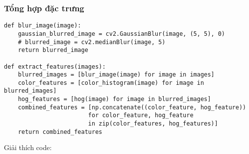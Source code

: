 \documentclass[a4paper,12pt]{article}
\begin{document}
\subsubsection{Tổng hợp đặc trưng}
\label{subsubsec:tong-hop-dac-trung}

\begin{verbatim}
def blur_image(image):
    gaussian_blurred_image = cv2.GaussianBlur(image, (5, 5), 0)
    # blurred_image = cv2.medianBlur(image, 5)
    return blurred_image

def extract_features(images):
    blurred_images = [blur_image(image) for image in images]
    color_features = [color_histogram(image) for image in blurred_images]
    hog_features = [hog(image) for image in blurred_images]
    combined_features = [np.concatenate((color_feature, hog_feature)) 
                        for color_feature, hog_feature 
                        in zip(color_features, hog_features)]
    return combined_features
\end{verbatim}

\noindent Giải thích code:
\end{document}

